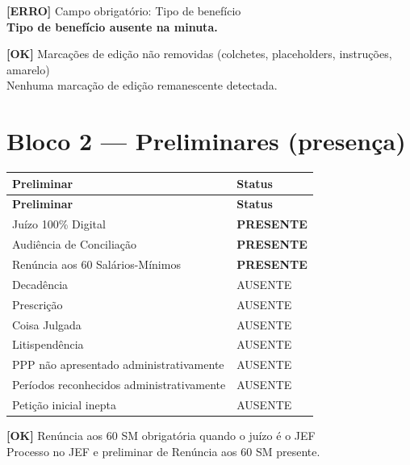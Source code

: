 \documentclass[12pt,a4paper]{article}
\newcommand{\statusOK}[1]{\textcolor{corOK}{\textbf{[OK]}} #1}
\newcommand{\statusERRO}[1]{\textcolor{corERRO}{\textbf{[ERRO]}} #1}
\begin{document}
\medskip
\statusERRO{Campo obrigatório: Tipo de benefício}\\
\textbf{Tipo de benefício ausente na minuta.}

\medskip
\statusOK{Marcações de edição não removidas (colchetes, placeholders, instruções, amarelo)}\\
Nenhuma marcação de edição remanescente detectada.

\section{Bloco 2 --- Preliminares (presença)}

\begin{longtable}{p{8.5cm} p{4.5cm}}
  \toprule
  \textbf{Preliminar} & \textbf{Status} \\
  \midrule
  \endfirsthead
  \toprule
  \textbf{Preliminar} & \textbf{Status} \\
  \midrule
  \endhead
  Juízo 100\% Digital                           & \textcolor{corOK}{\textbf{PRESENTE}} \\
  Audiência de Conciliação                      & \textcolor{corOK}{\textbf{PRESENTE}} \\
  Renúncia aos 60 Salários-Mínimos              & \textcolor{corOK}{\textbf{PRESENTE}} \\
  Decadência                                    & AUSENTE \\
  Prescrição                                    & AUSENTE \\
  Coisa Julgada                                 & AUSENTE \\
  Litispendência                                & AUSENTE \\
  PPP não apresentado administrativamente       & AUSENTE \\
  Períodos reconhecidos administrativamente     & AUSENTE \\
  Petição inicial inepta                        & AUSENTE \\
  \bottomrule
\end{longtable}

\statusOK{Renúncia aos 60 SM obrigatória quando o juízo é o JEF}\\
Processo no JEF e preliminar de Renúncia aos 60 SM presente.

\end{document}
